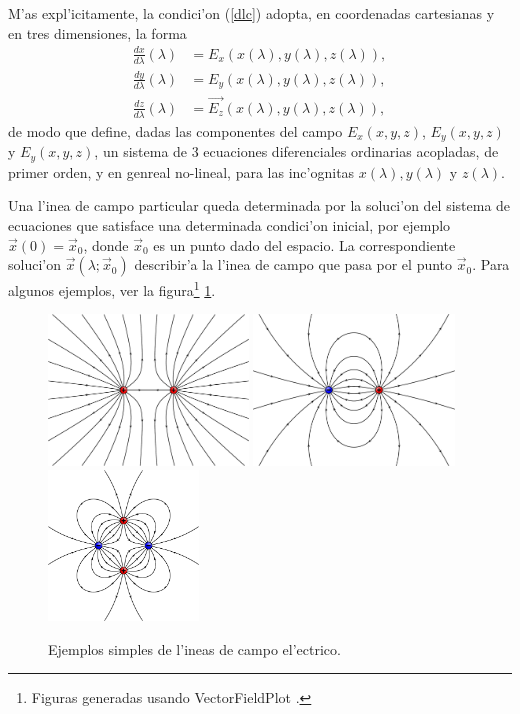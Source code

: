 M'as expl'icitamente, la condici'on (\ref{dlc}) adopta, en coordenadas cartesianas y en tres dimensiones, la forma 
\begin{align}
\frac{dx}{d\lambda}(\lambda) &= {E_x}(x(\lambda),y(\lambda),z(\lambda)), \\
\frac{dy}{d\lambda}(\lambda) &= {E_y}(x(\lambda),y(\lambda),z(\lambda)),\\
\frac{dz}{d\lambda}(\lambda) &= \vec{E_z}(x(\lambda),y(\lambda),z(\lambda)),
\end{align}
de modo que define, dadas las componentes del campo $E_x(x,y,z)$, $E_y(x,y,z)$ y $E_y(x,y,z)$, un sistema de 3 ecuaciones diferenciales ordinarias acopladas, de primer orden, y en genreal no-lineal, para las inc'ognitas $x(\lambda),y(\lambda)$ y $z(\lambda)$.

Una l'inea de campo particular queda determinada por la soluci'on del sistema de ecuaciones que satisface una determinada condici'on inicial, por ejemplo $\vec{x}(0)=\vec{x}_0$, donde $\vec{x}_0$ es un punto dado del espacio. La correspondiente soluci'on $\vec{x}(\lambda;\vec{x}_0)$ describir'a la l'inea de campo que pasa por el punto $\vec{x}_0$. Para algunos ejemplos, ver la figura\footnote{Figuras generadas usando VectorFieldPlot \cite{VFP}.} \ref{fig-E}.

\begin{center}
\begin{figure}[H]
\centerline{\includegraphics[height=4cm]{fig/fig-E-01.pdf}\hfill 
\includegraphics[height=4cm]{fig/fig-E-02.pdf}\hfill
\includegraphics[height=4cm]{fig/fig-E-03.pdf}}
\caption{Ejemplos simples de l'ineas de campo el'ectrico.}
\label{fig-E}
\end{figure}
\end{center}

